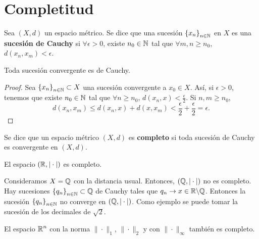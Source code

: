 \section{Completitud}
\begin{definition}
	Sea $\displaystyle \left(X,d\right) $ un espacio métrico. Se dice que una sucesión $\displaystyle \left\{ x_{n}\right\} _{n\in\mathbb{N}} $ en $\displaystyle X $ es una \textbf{sucesión de Cauchy} si $\displaystyle \forall \epsilon > 0 $, existe $\displaystyle n_{0} \in \mathbb{N} $ tal que $\displaystyle \forall m,n \geq n_{0} $, $\displaystyle d\left(x_{n}, x_{m}\right) < \epsilon  $.
\end{definition}
\begin{prop}
Toda sucesión convergente es de Cauchy.
\end{prop}
\begin{proof}
	Sea $\displaystyle \left\{ x_{n}\right\} _{n\in\mathbb{N}} \subset X $ una sucesión convergente a $\displaystyle x_{0} \in X $.  Así, si $\displaystyle \epsilon > 0 $, tenemos que existe $\displaystyle n_{0} \in \mathbb{N} $ tal que $\displaystyle \forall n \geq n_{0} $, $\displaystyle d\left(x_{n}, x\right) < \frac{\epsilon }{2} $. Si $\displaystyle n, m \geq n_{0} $,
	\[d\left(x_{n}, x_{m}\right) \leq d\left(x_{n}, x\right) + d\left(x, x_{m}\right) < \frac{\epsilon }{2} + \frac{\epsilon }{2} = \epsilon  .\]
\end{proof}
\begin{definition}
Se dice que un espacio métrico $\displaystyle \left(X,d\right) $ es \textbf{completo} si toda sucesión de Cauchy es convergente en $\displaystyle \left(X,d\right) $.
\end{definition}
\begin{theorem}
El espacio $\displaystyle \left(\mathbb{R}, |\cdot|\right) $ es completo.
\end{theorem}
\begin{eg}
	Consideramos $\displaystyle X = \mathbb{Q} $ con la distancia usual. Entonces, $\displaystyle \left(\mathbb{Q}, | \cdot |\right) $ no es completo. Hay sucesiones $\displaystyle \left\{ q_{n}\right\} _{n\in\mathbb{N}} \subset \mathbb{Q} $ de Cauchy tales que $\displaystyle q_{n} \to x \in \mathbb{R}\backslash\mathbb{Q} $. Entonces la sucesión $\displaystyle \left\{ q_{n}\right\} _{n\in\mathbb{N}} $ no converge en $\displaystyle \left(\mathbb{Q}, | \cdot |\right) $. Como ejemplo se puede tomar la sucesión de los decimales de $\displaystyle \sqrt{2} $.
\end{eg}
\begin{colorary}
El espacio $\displaystyle \mathbb{R}^{n} $ con la norma $\displaystyle \| \cdot \|_{1} $, $\displaystyle \| \cdot \|_{2} $ y con $\displaystyle \| \cdot \|_{\infty} $ también es completo.
\end{colorary}
